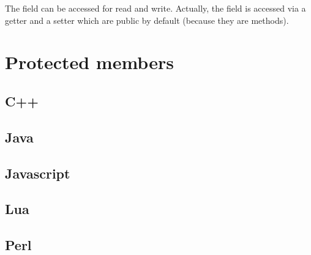 \documentclass{KodeBook}
\begin{document}


The field can be accessed for read and write. 
Actually, the field is accessed via a getter and a setter which are public by default (because they are methods).




\section{Protected members}

\subsection{C++}

%

\subsection{Java}

%

\subsection{Javascript} 

%

%


\subsection{Lua}


\subsection{Perl}

%
\end{document}

